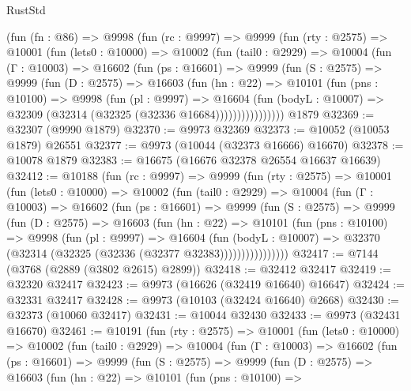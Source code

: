 \begin{lexlean}{RustStd}
\begin{coremodule}
    (fun (fn : @86) =>
    @9998
      (fun (rc : @9997) =>
      @9999
        (fun (rty : @2575) =>
        @10001
          (fun (lets0 : @10000) =>
          @10002
            (fun (tail0 : @2929) =>
            @10004
              (fun (Γ : @10003) =>
              @16602
                (fun (ps : @16601) =>
                @9999
                  (fun (S : @2575) =>
                  @9999
                    (fun (D : @2575) =>
                    @16603
                      (fun (hn : @22) =>
                      @10101
                        (fun (pns : @10100) =>
                        @9998
                          (fun (pl : @9997) =>
                          @16604
                            (fun (bodyL : @10007) =>
                            @32309 (@32314 (@32325 (@32336 @16684))))))))))))))))
    @1879
@32369 := @32307 (@9990 @1879)
@32370 := @9973 @32369
@32373 := @10052 (@10053 @1879) @26551
@32377 := @9973 (@10044 (@32373 @16666) @16670)
@32378 := @10078 @1879
@32383 := @16675 (@16676 @32378 @26554 @16637 @16639)
@32412 := @10188
    (fun (rc : @9997) =>
    @9999
      (fun (rty : @2575) =>
      @10001
        (fun (lets0 : @10000) =>
        @10002
          (fun (tail0 : @2929) =>
          @10004
            (fun (Γ : @10003) =>
            @16602
              (fun (ps : @16601) =>
              @9999
                (fun (S : @2575) =>
                @9999
                  (fun (D : @2575) =>
                  @16603
                    (fun (hn : @22) =>
                    @10101
                      (fun (pns : @10100) =>
                      @9998
                        (fun (pl : @9997) =>
                        @16604
                          (fun (bodyL : @10007) =>
                          @32370 (@32314 (@32325 (@32336 (@32377 @32383))))))))))))))))
@32417 := @7144 (@3768 (@2889 (@3802 @2615) @2899))
@32418 := @32412 @32417
@32419 := @32320 @32417
@32423 := @9973 (@16626 (@32419 @16640) @16647)
@32424 := @32331 @32417
@32428 := @9973 (@10103 (@32424 @16640) @2668)
@32430 := @32373 (@10060 @32417)
@32431 := @10044 @32430
@32433 := @9973 (@32431 @16670)
@32461 := @10191
    (fun (rty : @2575) =>
    @10001
      (fun (lets0 : @10000) =>
      @10002
        (fun (tail0 : @2929) =>
        @10004
          (fun (Γ : @10003) =>
          @16602
            (fun (ps : @16601) =>
            @9999
              (fun (S : @2575) =>
              @9999
                (fun (D : @2575) =>
                @16603
                  (fun (hn : @22) =>
                  @10101
                    (fun (pns : @10100) =>

\end{coremodule}
\end{lexlean}
